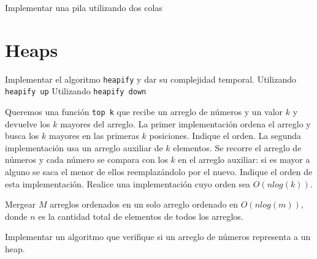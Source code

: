 \documentclass[titlepage,oneside]{book}
\begin{document}
\begin{Exercise}
Implementar una pila utilizando dos colas
\end{Exercise}

\chapter{Heaps}

\begin{Exercise}
	Implementar el algoritmo \texttt{heapify} y dar su complejidad temporal.
	\Question Utilizando \texttt{heapify up}
	\Question Utilizando \texttt{heapify down}
\end{Exercise}

\begin{Exercise}
    Queremos una función \texttt{top k} que recibe un arreglo de números y un valor $k$ y devuelve los $k$ mayores del arreglo.
	\Question La primer implementación ordena el arreglo y busca los $k$ mayores en las primeras $k$ posiciones. Indique el orden.
	\Question La segunda implementación usa un arreglo auxiliar de $k$ elementos. Se recorre el arreglo de números y cada número se compara con los $k$ en el arreglo auxiliar: si es mayor a alguno se saca el menor de ellos reemplazándolo por el nuevo. Indique el orden de esta implementación.
    \Question Realice una implementación cuyo orden sea $O(n log(k))$.
\end{Exercise}

\begin{Exercise}
    Mergear $M$ arreglos ordenados en un solo arreglo ordenado en $O(n log(m))$, donde $n$ es la cantidad total de elementos de todos los arreglos.
\end{Exercise}

\begin{Exercise}
    Implementar un algoritmo que verifique si un arreglo de números representa a un heap.
\end{Exercise}
\end{document}
